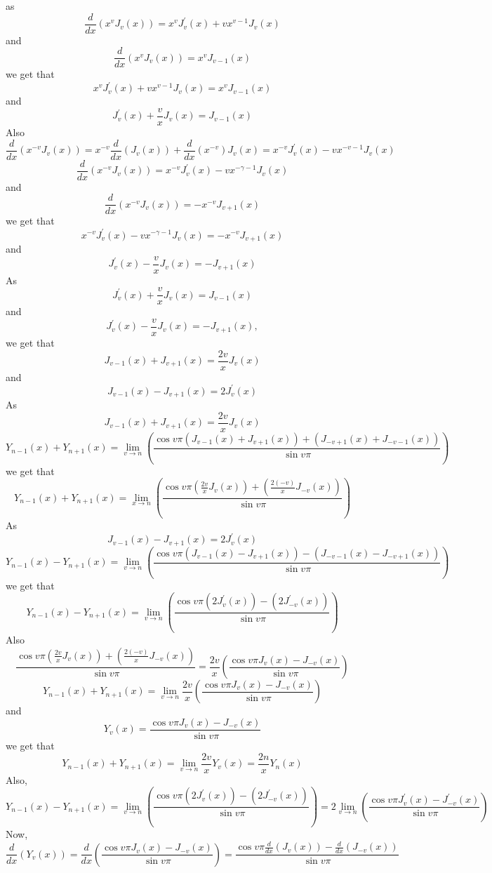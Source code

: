 as
$$
\frac{d}{d x}\left(x^{v} J_{v}(x)\right)=x^{v} J_{v}^{\prime}(x)+v x^{v-1} J_{v}(x)
$$
and
$$
\frac{d}{d x}\left(x^{v} J_{v}(x)\right)=x^{v} J_{v-1}(x)
$$
we get that
$$
x^{v} J_{v}^{\prime}(x)+v x^{v-1} J_{v}(x)=x^{v} J_{v-1}(x)
$$
and
$$
J_{v}^{\prime}(x)+\frac{v}{x} J_{v}(x)=J_{v-1}(x)
$$
Also
$$
\frac{d}{d x}\left(x^{-v} J_{v}(x)\right)=x^{-v} \frac{d}{d x}\left(J_{v}(x)\right)+\frac{d}{d x}\left(x^{-v}\right) J_{v}(x)=x^{-v} J_{v}^{\prime}(x)-v x^{-v-1} J_{v}(x)
$$
$$
\frac{d}{d x}\left(x^{-v} J_{v}(x)\right)=x^{-v} J_{v}^{\prime}(x)-v x^{-\gamma-1} J_{v}(x)
$$
and
$$
\frac{d}{d x}\left(x^{-v} J_{v}(x)\right)=-x^{-v} J_{v+1}(x)
$$
we get that
$$
x^{-v} J_{v}^{\prime}(x)-v x^{-\gamma-1} J_{v}(x)=-x^{-v} J_{v+1}(x)
$$
and
$$
J_{v}^{\prime}(x)-\frac{v}{x} J_{v}(x)=-J_{v+1}(x)
$$
As $$J_{v}^{\prime}(x)+\frac{v}{x} J_{v}(x)=J_{v-1}(x)$$ 
and 
$$J_{v}^{\prime}(x)-\frac{v}{x} J_{v}(x)=-J_{v+1}(x),$$
we get that
$$J_{v-1}(x)+J_{v+1}(x)=\frac{2 v}{x} J_{v}(x)$$ and 
$$J_{v-1}(x)-J_{v+1}(x)=2 J_{v}^{\prime}(x)$$
As
$$J_{v-1}(x)+J_{v+1}(x)=\frac{2 v}{x} J_{v}(x)$$
$$
Y_{n-1}(x)+Y_{n+1}(x)=\lim _{v \rightarrow n}\left(\frac{\cos v \pi\left(J_{v-1}(x)+J_{v+1}(x)\right)+\left(J_{-v+1}(x)+J_{-v-1}(x)\right)}{\sin v \pi}\right)
$$
we get that
$$
Y_{n-1}(x)+Y_{n+1}(x)=\lim _{x \rightarrow n}\left(\frac{\cos v \pi\left(\frac{2 v}{x} J_{v}(x)\right)+\left(\frac{2(-v)}{x} J_{-v}(x)\right)}{\sin v \pi}\right)
$$
As
$$
J_{v-1}(x)-J_{v+1}(x)=2 J_{v}^{\prime}(x)
$$
$$
Y_{n-1}(x)-Y_{n+1}(x)=\lim _{v \rightarrow n}\left(\frac{\cos v \pi\left(J_{v-1}(x)-J_{v+1}(x)\right)-\left(J_{-v-1}(x)-J_{-v+1}(x)\right)}{\sin v \pi}\right)
$$
we get that
$$
Y_{n-1}(x)-Y_{n+1}(x)=\lim _{v \rightarrow n}\left(\frac{\cos v \pi\left(2 J_{v}^{\prime}(x)\right)-\left(2 J_{-v}^{\prime}(x)\right)}{\sin v \pi}\right)
$$
Also
$$
\frac{\cos v \pi\left(\frac{2 v}{x} J_{v}(x)\right)+\left(\frac{2(-v)}{x} J_{-v}(x)\right)}{\sin v \pi}=\frac{2 v}{x}\left(\frac{\cos v \pi J_{v}(x)-J_{-v}(x)}{\sin v \pi}\right)
$$
$$
Y_{n-1}(x)+Y_{n+1}(x)=\lim _{v \rightarrow n} \frac{2 v}{x}\left(\frac{\cos v \pi J_{v}(x)-J_{-v}(x)}{\sin v \pi}\right)
$$
and
$$
Y_{v}(x)=\frac{\cos v \pi J_{v}(x)-J_{-v}(x)}{\sin v \pi}
$$
we get that
$$
Y_{n-1}(x)+Y_{n+1}(x)=\lim _{v \rightarrow n} \frac{2 v}{x} Y_{v}(x)=\frac{2 n}{x} Y_{n}(x)
$$
Also,
$$
Y_{n-1}(x)-Y_{n+1}(x)=\lim _{v \rightarrow n}\left(\frac{\cos v \pi\left(2 J_{v}^{\prime}(x)\right)-\left(2 J_{-v}^{\prime}(x)\right)}{\sin v \pi}\right)=2 \lim _{v \rightarrow n}\left(\frac{\cos v \pi J_{v}^{\prime}(x)-J_{-v}^{\prime}(x)}{\sin v \pi}\right)
$$
Now,
$$
\frac{d}{d x}\left(Y_{v}(x)\right)=\frac{d}{d x}\left(\frac{\cos v \pi J_{v}(x)-J_{-v}(x)}{\sin v \pi}\right)=\frac{\cos v \pi \frac{d}{d x}\left(J_{v}(x)\right)-\frac{d}{d x}\left(J_{-v}(x)\right)}{\sin v \pi}
$$
